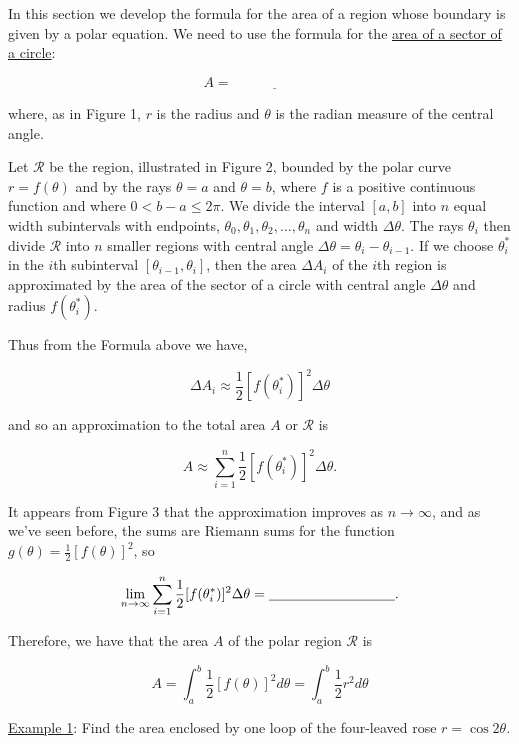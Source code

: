 \documentclass[paper=a4, fontsize=11pt]{scrartcl} %
\numberwithin{equation}{section} %
\numberwithin{figure}{section} %
\numberwithin{table}{section} %
\newcommand{\ds}{\displaystyle}
\begin{document}
In this section we develop the formula for the area of a region whose boundary is given by a polar equation. We need to use the formula for the \underline{area of a sector of a circle}:

\[A = \underline{\hspace{1in}}\]

where, as in Figure 1, $r$ is the radius and $\theta$ is the radian measure of the central angle.\\
\indent

Let $\mathcal{R}$ be the region, illustrated in Figure 2, bounded by the polar curve $r=f(\theta)$ and by the rays $\theta = a$ and $\theta = b$, where $f$ is a positive continuous function and where $0<b-a\leq 2\pi$. We divide the interval $[a,b]$ into $n$ equal width subintervals with endpoints, $\theta_0,\theta_1,\theta_2,\ldots,\theta_n$ and width $\Delta \theta$. The rays $\theta_i$ then divide $\mathcal{R}$ into $n$ smaller regions with central angle $\Delta\theta = \theta_i - \theta_{i-1}$. If we choose $\theta_i^*$ in the $i$th subinterval $[\theta_{i-1},\theta_i]$, then the area $\Delta A_i$ of the $i$th region is approximated by the area of the sector of a circle with central angle $\Delta \theta$ and radius $f(\theta_i^*)$.\\
\indent

Thus from the Formula above we have,

\[\Delta A_i \approx \ds\frac{1}{2}[f(\theta_i^*)]^2\Delta\theta\]

and so an approximation to the total area $A$ or $\mathcal{R}$ is

\[A\approx \ds\sum_{i=1}^n \ds\frac{1}{2}[f(\theta_i^*)]^2\Delta\theta.\]

It appears from Figure 3 that the approximation improves as $n\to\infty$, and as we've seen before, the sums are Riemann sums for the function $g(\theta)=\ds\frac{1}{2}[f(\theta)]^2$, so

\[\ds\lim_{n\to\infty}\ds\sum_{i=1}^n\ds\frac{1}{2}[f(\theta_i^*)]^2\Delta\theta = \underline{\hspace{1.25in}}.\]
\indent

Therefore, we have that the area $A$ of the polar region $\mathcal{R}$ is

\[\boxed{ \quad A = \ds\int_a^b \ds\frac{1}{2}[f(\theta)]^2 d\theta  = \ds\int_a^b \ds\frac{1}{2}r^2 d\theta \quad }\]
\indent

\newpage
\underline{Example 1}: Find the area enclosed by one loop of the four-leaved rose $r=\cos2\theta$.\\
\indent
\end{document}
